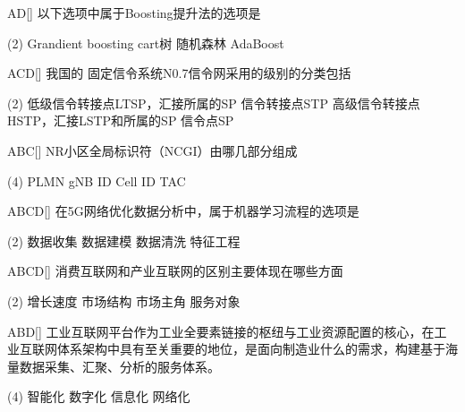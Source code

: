 \begin{choice}{\;AD\;}[]
    以下选项中属于Boosting提升法的选项是
    \begin{tasks}(2)
        \task Grandient boosting
        \task cart树
        \task 随机森林
        \task AdaBoost
    \end{tasks}
\end{choice}


\begin{choice}{\;ACD\;}[]
    我国的  固定信令系统N0.7信令网采用的级别的分类包括
    \begin{tasks}(2)
        \task 低级信令转接点LTSP，汇接所属的SP
        \task 信令转接点STP
        \task 高级信令转接点HSTP，汇接LSTP和所属的SP
        \task 信令点SP
    \end{tasks}
\end{choice}


\begin{choice}{\;ABC\;}[]
    NR小区全局标识符（NCGI）由哪几部分组成
    \begin{tasks}(4)
        \task PLMN
        \task gNB ID
        \task Cell ID
        \task TAC
    \end{tasks}
\end{choice}

\begin{choice}{\;ABCD\;}[]
    在5G网络优化数据分析中，属于机器学习流程的选项是
    \begin{tasks}(2)
        \task 数据收集
        \task 数据建模
        \task 数据清洗
        \task 特征工程
    \end{tasks}
\end{choice}

\begin{choice}{\;ABCD\;}[]
    消费互联网和产业互联网的区别主要体现在哪些方面
    \begin{tasks}(2)
        \task 增长速度
        \task 市场结构
        \task 市场主角
        \task 服务对象
    \end{tasks}
\end{choice}

\begin{choice}{\;ABD\;}[]
    工业互联网平台作为工业全要素链接的枢纽与工业资源配置的核心，在工业互联网体系架构中具有至关重要的地位，是面向制造业什么的需求，构建基于海量数据采集、汇聚、分析的服务体系。
    \begin{tasks}(4)
        \task 智能化
        \task 数字化
        \task 信息化
        \task 网络化
    \end{tasks}
\end{choice}

